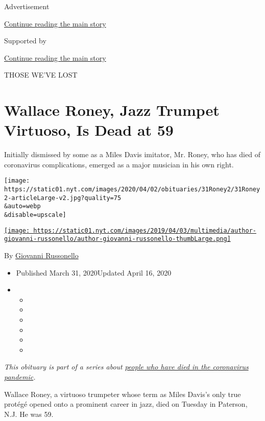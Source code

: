 Advertisement

\protect\hyperlink{after-top}{Continue reading the main story}

Supported by

\protect\hyperlink{after-sponsor}{Continue reading the main story}

THOSE WE'VE LOST

\hypertarget{wallace-roney-jazz-trumpet-virtuoso-is-dead-at-59}{%
\section{Wallace Roney, Jazz Trumpet Virtuoso, Is Dead at
59}\label{wallace-roney-jazz-trumpet-virtuoso-is-dead-at-59}}

Initially dismissed by some as a Miles Davis imitator, Mr. Roney, who
has died of coronavirus complications, emerged as a major musician in
his own right.

\texttt{[image: https://static01.nyt.com/images/2020/04/02/obituaries/31Roney2/31Roney2-articleLarge-v2.jpg?quality=75\\\&auto=webp\\\&disable=upscale]}

\href{https://www.nytimes.com/by/giovanni-russonello}{\texttt{[image: https://static01.nyt.com/images/2019/04/03/multimedia/author-giovanni-russonello/author-giovanni-russonello-thumbLarge.png]}}

By \href{https://www.nytimes.com/by/giovanni-russonello}{Giovanni
Russonello}

\begin{itemize}
\item
  Published March 31, 2020Updated April 16, 2020
\item
  \begin{itemize}
  \item
  \item
  \item
  \item
  \item
  \item
  \end{itemize}
\end{itemize}

\emph{This obituary is part of a series about}
\href{https://www.nytimes.com/series/people-who-have-died-of-the-coronavirus}{\emph{people
who have died in the coronavirus pandemic}}\emph{.}

Wallace Roney, a virtuoso trumpeter whose term as Miles Davis's only
true protégé opened onto a prominent career in jazz, died on Tuesday in
Paterson, N.J. He was 59.

